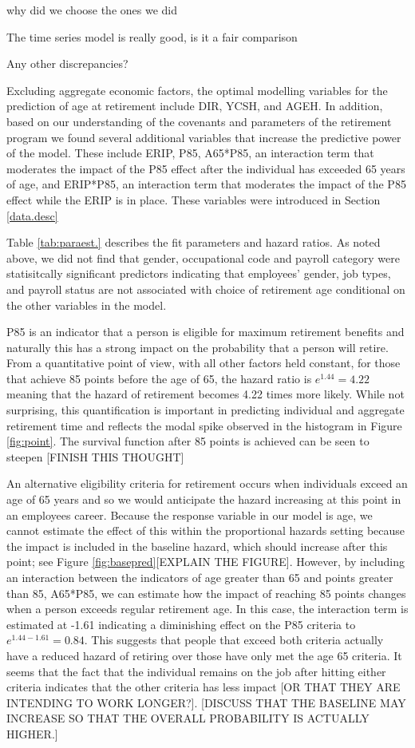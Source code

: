 \documentclass[12pt,letterpaper]{article}
\begin{document}
why did we choose the ones we did

The time series model is really good, is it a fair comparison

Any other discrepancies?

Excluding aggregate economic factors, the optimal modelling variables for the prediction of age at retirement include DIR, YCSH, and AGEH.  In addition, based on our understanding of the covenants and parameters of the retirement program we found several additional variables that increase the predictive power of the model. These include ERIP, P85, A65*P85, an interaction term that moderates the impact of the P85 effect after the individual has exceeded 65 years of age, and  ERIP*P85, an interaction term that moderates the impact of the P85 effect while the ERIP is in place.  These variables were introduced in Section \ref{data.desc}

Table \ref{tab:paraest.} describes the fit parameters and hazard ratios.  As noted above, we did not find that gender, occupational code and payroll category were statisitcally significant predictors indicating that employees' gender, job types, and payroll status are not associated with choice of retirement age conditional on the other variables in the model.

P85 is an indicator that a person is eligible for maximum retirement benefits and naturally this has a strong impact on the probability that a person will retire.  From a quantitative point of view, with all other factors held constant, for those that achieve 85 points before the age of 65, the hazard ratio is $e^{1.44} = 4.22$ meaning that the hazard of retirement becomes 4.22 times more likely.  While not surprising, this quantification is important in predicting individual and aggregate retirement time and reflects the modal spike observed in the histogram in Figure \ref{fig:point}.  The survival function after 85 points is achieved can be seen to steepen [FINISH THIS THOUGHT]


An alternative eligibility criteria for retirement occurs when individuals exceed an age of 65 years and so we would anticipate the hazard increasing at this point in an employees career.  Because the response variable in our model is age, we cannot estimate the effect of this within the proportional hazards setting because the impact is included in the baseline hazard, which should increase after this point; see Figure \ref{fig:basepred}[EXPLAIN THE FIGURE].  However, by including an interaction between the indicators of age greater than 65 and points greater than 85, A65*P85, we can estimate how the impact of reaching 85 points changes when a person exceeds regular retirement age.  In this case, the interaction term is estimated at -1.61 indicating a diminishing effect on the P85 criteria to $e^{1.44-1.61} =0.84$.  This suggests that people that exceed both criteria actually have a reduced hazard of retiring over those have only met the age 65 criteria.  It seems that the fact that the individual remains on the job after hitting either criteria indicates that the other criteria has less impact [OR THAT THEY ARE INTENDING TO WORK LONGER?].  [DISCUSS THAT THE BASELINE MAY INCREASE SO THAT THE OVERALL PROBABILITY IS ACTUALLY HIGHER.]
\end{document}
